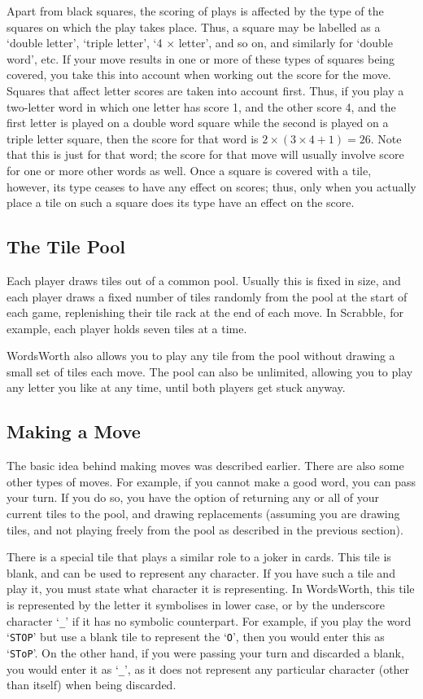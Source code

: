 Apart from black squares, the scoring of plays is affected by the
type of the squares on which the play takes place. Thus, a square 
may be labelled as a `double letter', `triple letter', `4 $\times$ letter',
and so on, and similarly for `double word', etc. If your move
 results in one or more of these types of squares being covered,
you take this into account when working out the score for the move.
Squares that affect letter scores are taken into account first. 
Thus, if you play a two-letter word in which one letter has score
1, and the other score 4, and the first letter is played on a
double word square while the second is played on a triple letter
square, then the score for that word is $2\times(3\times4+1) = 26$. Note
that this is just for that word; the score for that move will
usually involve score for one or more other words as well. Once
a square is covered with a tile, however, its type ceases to have
any effect on scores; thus, only when you actually place a tile on
such a square does its type have an effect on the score.

\subsection{The Tile Pool}

Each player draws tiles out of a common pool. Usually this is 
fixed in size, and each player draws a fixed number of tiles
randomly from the pool at the start of each game, replenishing
their tile rack at the end of each move. In Scrabble, for example,
each player holds seven tiles at a time.

WordsWorth also allows you to play any tile from the pool without
drawing a small set of tiles each move. The pool can also be
unlimited, allowing you to play any letter you like at
any time, until both players get stuck anyway.

\subsection{Making a Move}

The basic idea behind making moves was described earlier. There 
are also some other types of moves. For example, if you cannot
make a good word, you can pass your turn. If you do so, you have
the option of returning any or all of your current tiles to the
pool, and drawing replacements (assuming you are drawing tiles,
and not playing freely from the pool as described in the previous 
section).

There is a special tile that plays a similar role to a joker in
cards. This tile is blank, and can be used to represent any
character. If you have such a tile and play it, you must state
what character it is representing. In WordsWorth, this tile is
represented by the letter it symbolises in lower case, or by the
underscore character `{\tt \_}' if it has no symbolic counterpart. For example, if you play the
word `{\tt STOP}' but use a blank tile to represent the `{\tt O}', then you would
enter this as `{\tt SToP}'. On the other hand, if you were passing your
turn and discarded a blank, you would enter it as `{\tt \_}', as it does
not represent any particular character (other than itself) when
being discarded. 

